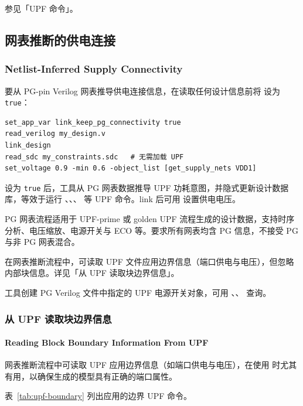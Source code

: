 \begin{seeAlsoBox}
参见「UPF 命令」。
\end{seeAlsoBox}

\subsection{网表推断的供电连接}
\subsubsection*{Netlist-Inferred Supply Connectivity}

要从 PG-pin Verilog 网表推导供电连接信息，在读取任何设计信息前将  设为 \texttt{true}：
\begin{lstlisting}
set_app_var link_keep_pg_connectivity true
read_verilog my_design.v
link_design
read_sdc my_constraints.sdc   # 无需加载 UPF
set_voltage 0.9 -min 0.6 -object_list [get_supply_nets VDD1]
\end{lstlisting}

设为 \texttt{true} 后，工具从 PG 网表数据推导 UPF 功耗意图，并隐式更新设计数据库，等效于运行 、、、 等 UPF 命令。link 后可用  设置供电电压。

PG 网表流程适用于 UPF-prime 或 golden UPF 流程生成的设计数据，支持时序分析、电压缩放、电源开关与 ECO 等。要求所有网表均含 PG 信息，不接受 PG 与非 PG 网表混合。

在网表推断流程中，可读取 UPF 文件应用边界信息（端口供电与电压），但忽略内部块信息。详见「从 UPF 读取块边界信息」。

工具创建 PG Verilog 文件中指定的 UPF 电源开关对象，可用 、、 查询。

\subsubsection{从 UPF 读取块边界信息}
\paragraph*{Reading Block Boundary Information From UPF}

网表推断流程中可读取 UPF 应用边界信息（如端口供电与电压），在使用  时尤其有用，以确保生成的模型具有正确的端口属性。

表~\ref{tab:upf-boundary} 列出应用的边界 UPF 命令。

